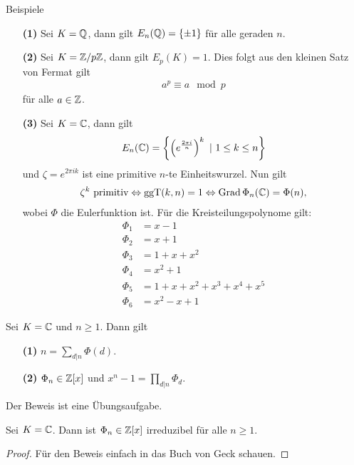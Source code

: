 \begin{genericdf}{Beispiele}\label{skript:11.2}
	\begin{enumerate}
		\item[\textbf{(1)}]
		Sei $K = \mathbb{Q}$, dann gilt $E_n(\mathbb{Q}) = \lbrace \pm 1 \rbrace$ für alle geraden $n$.
		
		\item[\textbf{(2)}]
		Sei $K = \mathbb{Z} / p \mathbb{Z}$, dann gilt $E_p(K) = 1$.
		Dies folgt aus den kleinen Satz von Fermat gilt
		\begin{align*}
		a^p \equiv a \mod p 
		\end{align*}
		für alle $a \in \mathbb{Z}$. 
		
		\item[\textbf{(3)}]
		Sei $K = \mathbb{C}$, dann gilt
		\begin{align*}
		E_n(\C) = \left\lbrace \left( e^{\frac{2 \pi i}{n}} \right)^k \ | \ 1 \leq k \leq n \right\rbrace
		\end{align*}
		und $\zeta = e^{2 \pi i k}$ ist eine primitive $n$-te Einheitswurzel.
		Nun gilt
		\begin{align*}
		\zeta^k \ \text{primitiv} 
		\Leftrightarrow
		\operatorname{ggT}(k,n) = 1 
		\Leftrightarrow
		\operatorname{Grad} \Phi_n(\mathbb{C}) = \Phi(n),
		\end{align*}
		wobei $\Phi$ die Eulerfunktion ist.
		Für die Kreisteilungspolynome gilt:
		\begin{align*}
		\Phi_1 &= x -1 \\
		\Phi_2 &= x+1  \\
		\Phi_3 &= 1 + x + x^2 \\
		\Phi_4 &= x^2 + 1 \\
		\Phi_5 &= 1 + x + x^2 + x^3 +x^4 + x^5\\
		\Phi_6 &= x^2 - x +1
		\end{align*}
	\end{enumerate}
\end{genericdf}

\begin{sz}\label{skript:11.3}
	Sei $K = \mathbb{C}$ und $n \geq 1$.
	Dann gilt
	\begin{enumerate}
		\item[\textbf{(1)}]
		$n = \sum \limits_{d | n} \Phi(d)$.
		\item[\textbf{(2)}]
		$\Phi_n \in \mathbb{Z}[x]$ und $x^n - 1 = \prod_{d | n } \Phi_d$.
	\end{enumerate}
	Der Beweis ist eine Übungsaufgabe.
\end{sz}

\begin{sz}\label{skript:11.4}
	Sei $K = \mathbb{C}$.
	Dann ist $\Phi_n \in \mathbb{Z}[x]$ irreduzibel für alle $n \geq 1$.
\end{sz}

\begin{proof}
	Für den Beweis einfach in das Buch von Geck schauen.
\end{proof}
